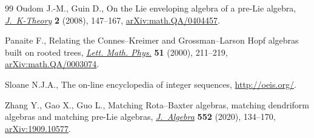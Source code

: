 \begin{thebibliography}{99}
Oudom J.-M., Guin D., On the {L}ie enveloping algebra of a pre-{L}ie algebra,
 \href{https://doi.org/10.1017/is008001011jkt037}{\textit{J.~K-Theory}} \textbf{2} (2008), 147--167, \href{https://arxiv.org/abs/math.QA/0404457}{arXiv:math.QA/0404457}.

Panaite F., Relating the {C}onnes--{K}reimer and {G}rossman--{L}arson {H}opf
 algebras built on rooted trees, \href{https://doi.org/10.1023/A:1007600216187}{\textit{Lett. Math. Phys.}} \textbf{51}
 (2000), 211--219, \href{https://arxiv.org/abs/math.QA/0003074}{arXiv:math.QA/0003074}.

Sloane N.J.A., The on-line encyclopedia of integer sequences,
 \url{http://oeis.org/}.

Zhang Y., Gao X., Guo L., Matching {R}ota--{B}axter algebras, matching
 dendriform algebras and matching pre-{L}ie algebras, \href{https://doi.org/10.1016/j.jalgebra.2020.02.011}{\textit{J.~Algebra}}
 \textbf{552} (2020), 134--170, \href{https://arxiv.org/abs/1909.10577}{arXiv:1909.10577}.

\end{thebibliography}
